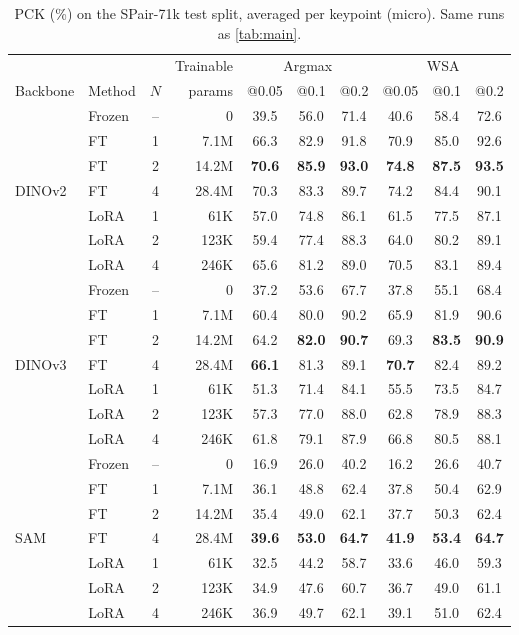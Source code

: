 \begin{table}[t]
\centering
\caption{PCK (\%) on the SPair-71k test split, averaged per keypoint (micro). Same runs as \cref{tab:main}.}
\label{tab:main_pt}
\small
\begin{tabular}{llcr ccc ccc}
\toprule
 & & & Trainable & \multicolumn{3}{c}{Argmax} & \multicolumn{3}{c}{WSA} \\
\cmidrule(lr){5-7}\cmidrule(lr){8-10}
Backbone & Method & $N$ & params & @0.05 & @0.1 & @0.2 & @0.05 & @0.1 & @0.2 \\
\midrule
\multirow{7}{*}{DINOv2} & Frozen & -- & 0 & 39.5 & 56.0 & 71.4 & 40.6 & 58.4 & 72.6 \\
 & FT & 1 & 7.1M & 66.3 & 82.9 & 91.8 & 70.9 & 85.0 & 92.6 \\
 & FT & 2 & 14.2M & \textbf{70.6} & \textbf{85.9} & \textbf{93.0} & \textbf{74.8} & \textbf{87.5} & \textbf{93.5} \\
 & FT & 4 & 28.4M & 70.3 & 83.3 & 89.7 & 74.2 & 84.4 & 90.1 \\
 & LoRA & 1 & 61K & 57.0 & 74.8 & 86.1 & 61.5 & 77.5 & 87.1 \\
 & LoRA & 2 & 123K & 59.4 & 77.4 & 88.3 & 64.0 & 80.2 & 89.1 \\
 & LoRA & 4 & 246K & 65.6 & 81.2 & 89.0 & 70.5 & 83.1 & 89.4 \\
\midrule
\multirow{7}{*}{DINOv3} & Frozen & -- & 0 & 37.2 & 53.6 & 67.7 & 37.8 & 55.1 & 68.4 \\
 & FT & 1 & 7.1M & 60.4 & 80.0 & 90.2 & 65.9 & 81.9 & 90.6 \\
 & FT & 2 & 14.2M & 64.2 & \textbf{82.0} & \textbf{90.7} & 69.3 & \textbf{83.5} & \textbf{90.9} \\
 & FT & 4 & 28.4M & \textbf{66.1} & 81.3 & 89.1 & \textbf{70.7} & 82.4 & 89.2 \\
 & LoRA & 1 & 61K & 51.3 & 71.4 & 84.1 & 55.5 & 73.5 & 84.7 \\
 & LoRA & 2 & 123K & 57.3 & 77.0 & 88.0 & 62.8 & 78.9 & 88.3 \\
 & LoRA & 4 & 246K & 61.8 & 79.1 & 87.9 & 66.8 & 80.5 & 88.1 \\
\midrule
\multirow{7}{*}{SAM} & Frozen & -- & 0 & 16.9 & 26.0 & 40.2 & 16.2 & 26.6 & 40.7 \\
 & FT & 1 & 7.1M & 36.1 & 48.8 & 62.4 & 37.8 & 50.4 & 62.9 \\
 & FT & 2 & 14.2M & 35.4 & 49.0 & 62.1 & 37.7 & 50.3 & 62.4 \\
 & FT & 4 & 28.4M & \textbf{39.6} & \textbf{53.0} & \textbf{64.7} & \textbf{41.9} & \textbf{53.4} & \textbf{64.7} \\
 & LoRA & 1 & 61K & 32.5 & 44.2 & 58.7 & 33.6 & 46.0 & 59.3 \\
 & LoRA & 2 & 123K & 34.9 & 47.6 & 60.7 & 36.7 & 49.0 & 61.1 \\
 & LoRA & 4 & 246K & 36.9 & 49.7 & 62.1 & 39.1 & 51.0 & 62.4 \\
\bottomrule
\end{tabular}
\end{table}
